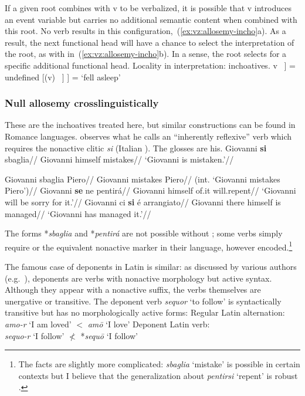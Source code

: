 If a given root combines with v to be verbalized, it is possible that v introduces an event variable but carries no additional semantic content when combined with this root. No verb results in this configuration,~(\ref{ex:vz:allosemy-incho}a). As a result, the next functional head will have a chance to select the interpretation of the root, as with {\vz} in~(\ref{ex:vz:allosemy-incho}b). In a sense, the root selects for a specific additional functional head.
\pex Locality in interpretation: inchoatives.\label{ex:vz:allosemy-incho}
    \a {[}v ~\!] = undefined
    \a {[} \textbf{\vz} [(v) ~\!] ] = `fell asleep'
\xe

\subsubsection{Null allosemy crosslinguistically}
These are the inchoatives treated here, but similar constructions can be found in Romance languages. \cite{burzio86} observes what he calls an ``inherently reflexive'' verb which requires the nonactive clitic \emph{si} (Italian ). The glosses are his.
\pex
	\a \begingl
		\gla Giovanni \textbf{si} sbaglia//
		\glb Giovanni himself mistakes//
		\glft `Giovanni is mistaken.'//
	\endgl
	
	\a \ljudge{*} \begingl
		\gla Giovanni sbaglia Piero//
		\glb Giovanni mistakes Piero//
		\glft (int. `Giovanni mistakes Piero')//
	\endgl
\xe
\ex
	\begingl
		\gla Giovanni \textbf{se} ne pentir\'a//
		\glb Giovanni himself of.it will.repent//
		\glft `Giovanni will be sorry for it.'//
	\endgl
\xe
\ex
	\begingl
		\gla Giovanni ci \textbf{si} \'e arrangiato//
		\glb Giovanni there himself is managed//
		\glft `Giovanni has managed it.'//
	\endgl
\xe

The forms *\emph{sbaglia} and *\emph{pentir\'a} are not possible without ; some verbs simply require  or the equivalent nonactive marker in their language, however encoded.\footnote{The facts are slightly more complicated: \emph{sbaglia} `mistake' is possible in certain contexts but I believe that the generalization about \emph{pentirsi} `repent' is robust \citep[40]{burzio86}.}

The famous case of deponents in Latin is similar: as discussed by various authors (e.g.~\citealt{xuetal07}), deponents are verbs with nonactive morphology but active syntax. Although they appear with a nonactive suffix, the verbs themselves are unergative or transitive. The deponent verb \emph{sequor} `to follow' is syntactically transitive but has no morphologically active forms:
\pex
    \a Regular Latin alternation:\\
        \emph{amo-r} `I am loved' $<$ \emph{am\=o} `I love'
    \a Deponent Latin verb:\\
        \emph{sequo-r} `I follow' $\nless$ *\emph{sequ\=o} `I follow'
\xe

